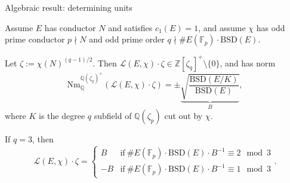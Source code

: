 \documentclass[10pt]{beamer}
\begin{document}
\begin{frame}[t]{Algebraic result: determining units}

Assume $ E $ has conductor $ N $ and satisfies $ c_1(E) = 1 $, and assume $ \chi $ has odd prime conductor $ p \nmid N $ and odd prime order $ q \nmid \#E(\mathbb{F}_p) \cdot \mathrm{BSD}(E) $.

\pause

\begin{theorem}
Let $ \zeta := \chi(N)^{(q - 1) / 2} $. Then $ \mathcal{L}(E, \chi) \cdot \zeta \in \mathbb{Z}[\zeta_q]^+ \setminus \{0\} $, and has norm $$ \mathrm{Nm}_\mathbb{Q}^{\mathbb{Q}(\zeta_q)^+}(\mathcal{L}(E, \chi) \cdot \zeta) = \pm\underbrace{\sqrt{\dfrac{\mathrm{BSD}(E / K)}{\mathrm{BSD}(E)}}}_B, $$ where $ K $ is the degree $ q $ subfield of $ \mathbb{Q}(\zeta_p) $ cut out by $ \chi $.
\end{theorem}

\pause

\begin{theorem}[A. 2024]
If $ q = 3 $, then $$ \mathcal{L}(E, \chi) \cdot \zeta = \begin{cases} B & \text{if} \ \#E(\mathbb{F}_p) \cdot \mathrm{BSD}(E) \cdot B^{-1} \equiv 2 \mod 3 \\ -B & \text{if} \ \#E(\mathbb{F}_p) \cdot \mathrm{BSD}(E) \cdot B^{-1} \equiv 1 \mod 3 \end{cases}. $$
\end{theorem}

\end{frame}
\end{document}
